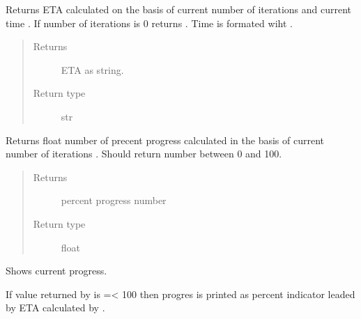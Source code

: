 \documentclass[a4paper,10pt,english]{sphinxmanual}
\begin{document}
\begin{fulllineitems}

\begin{fulllineitems}
\label{aqueduct.utils.log:aqueduct.utils.log.SimpleProgressBar.ETA}
Returns ETA calculated on the basis of current number of iterations
 and current time . If number of
iterations is 0 returns .
Time is formated wiht {\hyperref[aqueduct.utils.log:aqueduct.utils.log.smart_time_string]{}}.
\begin{quote}\begin{description}
\item[{Returns}] \leavevmode
ETA as string.

\item[{Return type}] \leavevmode
str

\end{description}\end{quote}

\end{fulllineitems}


\begin{fulllineitems}
\label{aqueduct.utils.log:aqueduct.utils.log.SimpleProgressBar.percent}
Returns float number of precent progress calculated in the basis
of current number of iterations . Should return
number between 0 and 100.
\begin{quote}\begin{description}
\item[{Returns}] \leavevmode
percent progress number

\item[{Return type}] \leavevmode
float

\end{description}\end{quote}

\end{fulllineitems}


\begin{fulllineitems}
\label{aqueduct.utils.log:aqueduct.utils.log.SimpleProgressBar.show}
Shows current progress.

If value returned by {\hyperref[aqueduct.utils.log:aqueduct.utils.log.SimpleProgressBar.percent]{}} is =\textless{} 100 then progres is printed as
percent indicator leaded by ETA calculated by {\hyperref[aqueduct.utils.log:aqueduct.utils.log.SimpleProgressBar.ETA]{}}.


\end{fulllineitems}
\end{fulllineitems}
\end{document}
